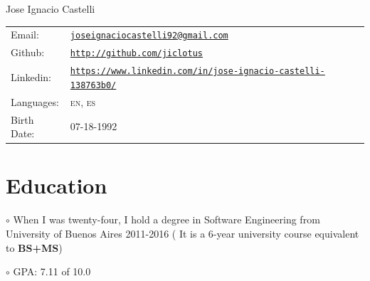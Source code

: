 \documentclass[letterpaper]{article}
\def\name{Jose Ignacio Castelli}
\newenvironment{no-indent-itemize}{
  \begin{list}{}{
    \setlength{\leftmargin}{0em}
  }
}{
  \end{list}
}
\def\bullet{$\circ$\xspace}
\begin{document}
{\huge \name}



\bigskip
\begin{minipage}{0.45\linewidth}
  \begin{tabular}{llll}
    
    
    Email: & \href{mailto:joseignaciocastelli92@gmail.com}{\tt joseignaciocastelli92@gmail.com} \\
     
    
    Github: &\href{http://github.com/jiclotus}{\tt http://github.com/jiclotus}\\
    
    Linkedin: &\href{https://www.linkedin.com/in/jose-ignacio-castelli-138763b0/}{\tt https://www.linkedin.com/in/jose-ignacio-castelli-138763b0/}\\
    
    Languages: & \textsc{en}, \textsc{es}\\
    Birth Date: & \textsc{07-18-1992}
    
    
  \end{tabular}
\end{minipage}


\hfill 
{}


\section*{Education}
\begin{no-indent-itemize}
  \item\bullet When I was twenty-four, I hold a degree in Software Engineering from University of Buenos Aires 2011-2016 ( It is a 6-year university course equivalent to \textbf{BS+MS}) 
  \item\bullet GPA: 7.11 of 10.0
\end{no-indent-itemize}
\end{document}

